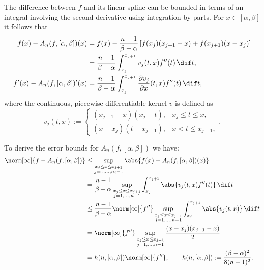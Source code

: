 \documentclass[]{elsarticle}
\theoremstyle{definition}
\theoremstyle{remark}
\begin{document}
The difference between $f$ and its linear spline can be bounded in terms of an integral involving the second derivative using integration by parts.  For $x \in [\alpha,\beta]$ it follows that
\begin{align}
f(x)-A_n(f,[\alpha,\beta])(x)
&= f(x) - \frac{n-1}{\beta-\alpha} \left[f(x_{j})(x_{j+1}-x) +f(x_{j+1})(x-x_j) \right] \nonumber\\
& = \frac{n-1}{\beta-\alpha}\int_{x_j}^{x_{j+1}} v_j(t,x) f''(t) \, \dif t, \label{fintermsfdoubprime}\\
f'(x)-A_n(f,[\alpha,\beta])'(x) & = \frac{n-1}{\beta-\alpha} \int_{x_j}^{x_{j+1}} \frac{\partial v_j}{\partial x}(t,x) f''(t) \, \dif t, \label{fprimeintermsfdoubprime}
\end{align}
where the continuous, piecewise differentiable kernel $v$ is defined as
\begin{equation*}
v_j(t,x) :=\begin{cases} (x_{j+1}-x)(x_j-t), & x_j\leq t\leq x,\\
(x-x_{j})(t- x_{j+1}), & x< t \leq x_{j+1},
\end{cases}.
\end{equation*}

To derive the error bounds for $A_{n}(f,[\alpha,\beta])$ we have:
\begin{align*}
\norm[\infty]{f-A_{n}(f,[\alpha,\beta])}
& \le \sup_{\substack{x_j \le x \le x_{j+1}\\ j=1, \ldots, n_i-1 }} \abs{f(x)-A_{n}(f,[\alpha,\beta])(x)}\\
&= \frac{n-1}{\beta-\alpha} \sup_{\substack{x_j \le x \le x_{j+1}\\ j=1, \ldots, n-1 }}  \int_{x_j}^{x_{j+1}} \abs{v_j(t,x) f''(t)} \, \dif t\\
&\le \frac{n-1}{\beta-\alpha} \norm[\infty]{f''} \sup_{\substack{x_j \le x \le x_{j+1}\\ j=1, \ldots, n-1 }}  \int_{x_j}^{x_{j+1}} \abs{v_j(t,x)} \, \dif t\\
&=\norm[\infty]{f''} \sup_{\substack{x_j \le x \le x_{j+1}\\ j=1, \ldots, n-1 }}  \frac{(x-x_j)(x_{j+1}-x)}2 \\
&= h(n,[\alpha,\beta]) \norm[\infty]{f''}, \qquad  h(n,[\alpha,\beta]):= \frac{(\beta-\alpha)^2}{8(n-1)^2}.
\end{align*}

\end{document}

